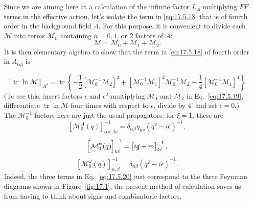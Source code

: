 Since we are aiming here at a calculation of the infinite factor $L_A$
multiplying $FF$ terms in the effective action, let's isolate the term in
\eqref{eq:17.5.18} that is of fourth order in the background field $A$. For
this purpose, it is convenient to divide each $\mathcal M$ into terms
$\mathcal M_n$ containing $n=0,1$, or 2 factors of $A$:
\begin{equation}
\mathcal M=\mathcal M_0+\mathcal M_1+\mathcal M_2.
\label{eq:17.5.19}
\end{equation}
It is then elementary algebra to show that the term in
\eqref{eq:17.5.18} of fourth order in $A_{\alpha\mu}$ is



\begin{equation}
\left[\operatorname{tr}\ln\mathcal M\right]_{A^4}
=\operatorname{tr}\left\{-\frac12\left[\mathcal M_0^{-1}\mathcal M_2\right]^2
+\left[\mathcal M_0^{-1}\mathcal M_1\right]^2\mathcal M_0^{-1}\mathcal M_2
-\frac14\left[\mathcal M_0^{-1}\mathcal M_1\right]^4\right\}.
\label{eq:17.5.20}
\end{equation}
(To see this, insert factors $\epsilon$ and $\epsilon^2$ multiplying
$\mathcal M_1$ and $\mathcal M_2$ in Eq.~\eqref{eq:17.5.19}, differentiate
$\operatorname{tr}\ln\mathcal M$ four times with respect to $\epsilon$, divide
by $4!$ and set $\epsilon=0$.) The $\mathcal M_0^{-1}$ factors here are just
the usual propagators; for $\xi=1$, these are
\begin{equation}
\left[\mathcal M_0^A(q)\right]^{-1}_{\alpha\mu,\beta\nu}
=\delta_{\alpha\beta}\eta_{\mu\nu}(q^2-i\epsilon)^{-1},
\label{eq:17.5.21}
\end{equation}
\begin{equation}
\left[\mathcal M_0^\psi(q)\right]^{-1}_{k\ell}
=\left[i\sl q+m\right]^{-1}_{k\ell},
\label{eq:17.5.22}
\end{equation}
\begin{equation}
\left[\mathcal M_0^\omega(q)\right]^{-1}_{\alpha,\beta}
=\delta_{\alpha\beta}(q^2-i\epsilon)^{-1}.
\label{eq:17.5.23}
\end{equation}
Indeed, the three terms in Eq.~\eqref{eq:17.5.20} just correspond to the
three Feynman diagrams shown in Figure~\ref{fig:17.1}; the present method
of calculation saves us from having to think about signs and combinatoric
factors.

